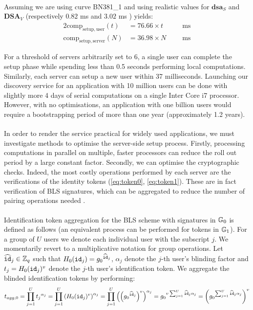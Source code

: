 	\paragraph{} Assuming we are using curve BN381\_1 and using realistic values for $\mathbf{dsa}_S$ and $\mathbf{DSA}_V$ (respectively $0.82$ ms and $3.02$ ms \cite{WolfSSl}) yields:
	\begin{alignat}{2}
		\mathrm{comp}_{\mathrm{setup, user}}(t) &= 76.66 \times t  \qquad &\mathrm{ms} \\
		\mathrm{comp}_{\mathrm{setup, server}}(N) &= 36.98\times N &\mathrm{ms}
	\end{alignat}
	
	\noindent For a threshold of servers arbitrarily set to $6$, a single user can complete the setup phase while spending less than 0.5 seconds performing local computations. Similarly, each server can setup a new user within 37 milliseconds. Launching our discovery service for an application with 10 million users can be done with slightly more 4 days of serial computations on a single Inter Core i7 processor. However, with no optimisations, an application with one billion users would require a bootstrapping period of more than one year (approximately 1.2 years).
	
	\paragraph{} In order to render the service practical for widely used applications, we must investigate methods to optimise the server-side setup process. Firstly, processing computations in parallel on multiple, faster processors can reduce the roll out period by a large constant factor. Secondly, we can optimise the cryptographic checks. Indeed, the most costly operations performed by each server are the verifications of the identity tokens (\autoref{eq:token0}, \autoref{eq:token1}). These are in fact verification of BLS signatures, which can be aggregated to reduce the number of pairing operations needed \cite{BLSagg}. 
	
	\paragraph{} Identification token aggregation for the BLS scheme with signatures in $\mathbb{G}_0$ is defined as follows (an equivalent process can be performed for tokens in $\mathbb{G}_1$). For a group of $U$ users  we denote each individual user with the subscript $j$. We momentarily revert to a multiplicative notation for group operations. Let $\widehat {\mathtt{id}}_j \in \mathbb{Z}_q$ such that $H_0(\mathtt{id}_j) = {g_0}^{\widehat{\mathtt{id}}_j}$, $\alpha_j$ denote the $j$-th user's blinding factor and $t_j = H_0(\mathtt{id}_j)^v$ denote the $j$-th user's identification token. We aggregate the blinded identification tokens by performing:
	\begin{equation}
		t_{agg,0} = \prod_{j=1}^{U} {t_j}^{\alpha_j} = \prod_{j=1}^{U} \left(H_0(\mathtt{id}_j)^v\right)^{\alpha_j} =  \prod_{j=1}^{U} \left(\left({g_0}^{\widehat{\mathtt{id}}_j}\right)^v\right)^{\alpha_j} = {g_0}^{v\sum_{j = 1}^U \widehat{\mathtt{id}}_j{\alpha_j}} = \left({g_0}^{\sum_{j = 1}^U \widehat{\mathtt{id}}_j{\alpha_j}}\right)^v
	\end{equation}
	
